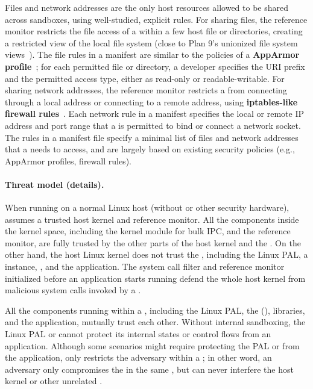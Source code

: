 Files and network addresses
are the only host resources allowed to be shared across sandboxes,
using well-studied, explicit rules.
For sharing files, the reference monitor restricts the file access of a \picoproc{}
within a few host file or directories,
creating a restricted view of the local file system
(close to Plan 9's unionized file system views~\cite{pike90plan9}).
The file rules
in a manifest are similar to the policies of a {\bf AppArmor profile}~\cite{apparmor};
for each permitted file or directory,
a developer specifies the URI prefix and the permitted access type, either as read-only or readable-writable. %
For sharing network addresses,
the reference monitor restricts a \picoproc{} from connecting through a local address or connecting to a remote address,
using {\bf iptables-like firewall rules}~\cite{iptablesman}.
Each network rule in a manifest
specifies the local or remote IP address and port range that a \picoproc{} is permitted to bind or connect a network socket.
The rules in a manifest file
specify a minimal list of files and network addresses that a \picoproc{} needs to access, and are largely based on existing security policies (e.g., AppArmor profiles, firewall rules).





\paragraph{Threat model (details).}
When running on a normal Linux host (without \sgx{} or other security hardware), \graphene{} assumes a trusted host kernel and reference monitor.
All the components inside the kernel space, including the  kernel module for bulk IPC, and the reference monitor,
are fully trusted by the other parts of the host kernel and the \graphene{} \picoprocs{}.
On the other hand,
the host Linux kernel does not trust the \picoproc{}, including the Linux PAL, a \thelibos{} instance, \glibc{}, and the application.
The system call filter and reference monitor
initialized before an application starts running
defend the whole host kernel from malicious system calls invoked by a \picoproc{}.



All the components running within a \picoproc{}, including the Linux PAL, the \libos{} (\thelibos{}), \glibc{} libraries, and the application,
mutually trust each other. %
Without internal sandboxing, the Linux PAL or \thelibos{}
cannot protect its internal states or control flows from an application.
Although some scenarios might require protecting the PAL or \thelibos{}
from the application,
\graphene{} only restricts the adversary
within a \picoproc{};
in other word, an adversary
only compromises the \libos{} in the same \picoproc{},
but can never interfere the host kernel 
or other unrelated \picoprocs{}.



